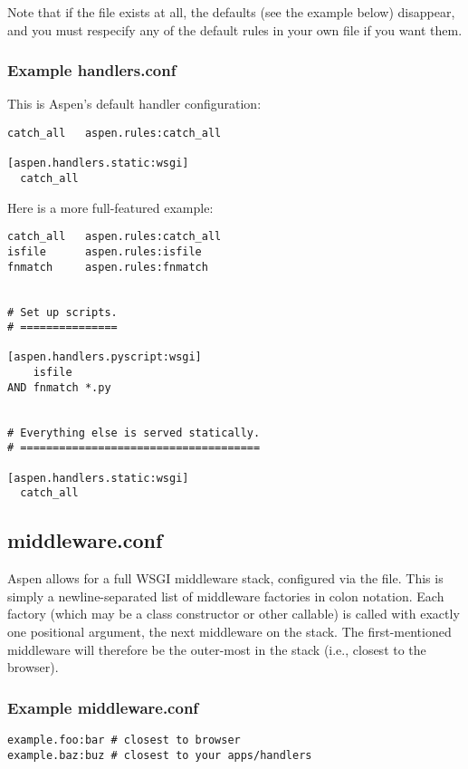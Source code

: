 Note that if the file  exists at all, the defaults
(see the example below) disappear, and you must respecify any of the default
rules in your own file if you want them.


\subsubsection{Example handlers.conf}
This is Aspen's default handler configuration:

\begin{verbatim}
catch_all   aspen.rules:catch_all

[aspen.handlers.static:wsgi]
  catch_all
\end{verbatim}


Here is a more full-featured example:

\begin{verbatim}
catch_all   aspen.rules:catch_all
isfile      aspen.rules:isfile
fnmatch     aspen.rules:fnmatch


# Set up scripts.
# ===============

[aspen.handlers.pyscript:wsgi]
    isfile
AND fnmatch *.py


# Everything else is served statically.
# =====================================

[aspen.handlers.static:wsgi]
  catch_all
\end{verbatim}

\subsection{middleware.conf}
\label{middleware-conf}

Aspen allows for a full WSGI middleware stack, configured via the
 file. This is simply a newline-separated list of
middleware factories in colon notation. Each factory (which may be a class
constructor or other callable) is called with exactly one positional argument,
the next middleware on the stack. The first-mentioned middleware will therefore
be the outer-most in the stack (i.e., closest to the browser).


\subsubsection{Example middleware.conf}

\begin{verbatim}
example.foo:bar # closest to browser
example.baz:buz # closest to your apps/handlers
\end{verbatim}


